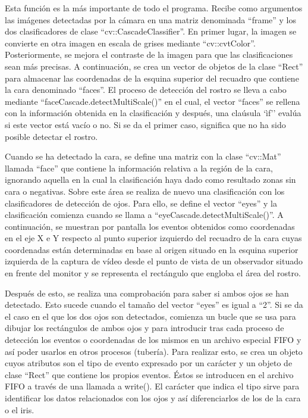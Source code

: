 \begin{itemize}
\begin{verbatim}
    \end{verbatim}
    
Esta función es la más importante de todo el programa. Recibe como argumentos las imágenes detectadas por la cámara en una matriz denominada ``frame'' y los dos clasificadores de clase ``cv::CascadeClassifier''. En primer lugar, la imagen se convierte en otra imagen en escala de grises mediante ``cv::cvtColor''. Posteriormente, se mejora el contraste de la imagen para que las clasificaciones sean más precisas. A continuación, se crea un vector de objetos de la clase ``Rect'' para almacenar las coordenadas de la esquina superior del recuadro que contiene la cara denominado ``faces''. El proceso de detección del rostro se lleva a cabo mediante ``faceCascade.detectMultiScale()'' en el cual, el vector ``faces'' se rellena con la información obtenida en la clasificación y después, una claúsula `ìf'' evalúa si este vector está vacío o no. Si se da el primer caso, significa que no ha sido posible detectar el rostro.

Cuando se ha detectado la cara, se define una matriz con la clase ``cv::Mat'' llamada ``face'' que contiene la información relativa a la región de la cara, ignorando aquella en la cual la clasificación haya dado como resultado zonas sin cara o negativas. Sobre este área se realiza de nuevo una clasificación con los clasificadores de detección de ojos. Para ello, se define el vector ``eyes'' y la clasificación comienza cuando se llama a ``eyeCascade.detectMultiScale()''. A continuación, se muestran por pantalla los eventos obtenidos como coordenadas en el eje X e Y respecto al punto superior izquierdo del recuadro de la cara cuyas coordenadas están determinadas en base al origen situado en la esquina superior izquierda de la captura de vídeo desde el punto de vista de un observador situado en frente del monitor y se representa el rectángulo que engloba el área del rostro.

Después de esto, se realiza una comprobación para saber si ambos ojos se han detectado. Esto sucede cuando el tamaño del vector ``eyes'' es igual a ``2''. Si se da el caso en el que los dos ojos son detectados, comienza un bucle que se usa para dibujar los rectángulos de ambos ojos y para introducir tras cada proceso de detección los eventos o coordenadas de los mismos en un archivo especial FIFO y así poder usarlos en otros procesos (tubería). Para realizar esto, se crea un objeto cuyos atributos son el tipo de evento expresado por un carácter y un objeto de clase ``Rect'' que contiene los propios eventos. Éstos se introducen en el archivo FIFO a través de una llamada a write(). El carácter que indica el tipo sirve para identificar los datos relacionados con los ojos y así diferenciarlos de los de la cara o el iris.
    

\end{itemize}
